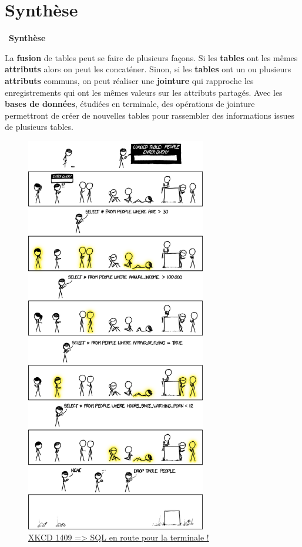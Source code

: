 \documentclass[
  11pt,
]{article}
\newenvironment{synthese}
{\par \medskip   \noindent   
\begin{bclogo}[arrondi =0.1,   noborder = true, logo=\bccle, marge=4]{~\textbf{Synthèse}   }  \par}
{
\end{bclogo}
 \par \bigskip }
\begin{document}
\hypertarget{synthuxe8se}{%
\section{Synthèse}\label{synthuxe8se}}

\begin{synthese}{}

La \textbf{fusion} de tables peut se faire de plusieurs façons. Si les
\textbf{tables} ont les mêmes \textbf{attributs} alors on peut les
concaténer. Sinon, si les \textbf{tables} ont un ou plusieurs
\textbf{attributs} communs, on peut réaliser une \textbf{jointure} qui
rapproche les enregistrements qui ont les mêmes valeurs sur les
attributs partagés. Avec les \textbf{bases de données}, étudiées en
terminale, des opérations de jointure permettront de créer de nouvelles
tables pour rassembler des informations issues de plusieurs tables.

\end{synthese}

\begin{figure}
\centering
\includegraphics[width=0.7\textwidth,height=\textheight]{Images/query.png}
\caption{\href{https://www.explainxkcd.com/wiki/index.php/1409:_Query}{XKCD
1409 =\textgreater{} SQL en route pour la terminale !}}
\end{figure}
\end{document}
